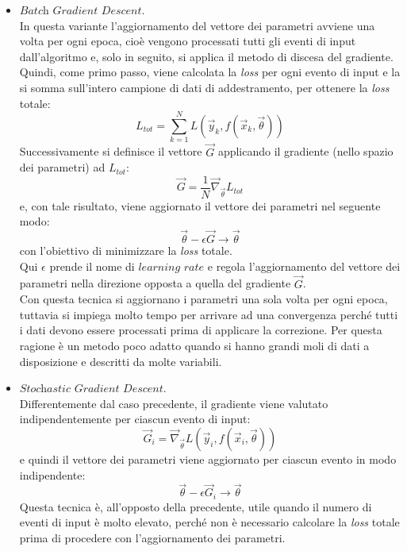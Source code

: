 \begin{itemize}
	\item $\textit{Batch Gradient Descent}$. \\
	In questa variante l'aggiornamento del vettore dei parametri avviene una volta per ogni epoca, cioè vengono processati tutti gli eventi di input dall'algoritmo e, solo in seguito, si applica il metodo di discesa del gradiente. Quindi, come primo passo, viene calcolata la \textit{loss} per ogni evento di input e la si somma sull'intero campione di dati di addestramento, per ottenere la \textit{loss} totale:
	\begin{equation}
		L_{tot} = \sum_{k=1}^{N} L(\vec{y}_k,f(\vec{x}_k,\vec{\theta}))
	\end{equation}
	Successivamente si definisce il vettore $\vec{G}$ applicando il gradiente (nello spazio dei parametri) ad $L_{tot}$:
	\begin{equation}
		\vec{G} = \frac{1}{N}  \vec{\nabla}_{\vec{\theta}} L_{tot}
	\end{equation}
	e, con tale risultato, viene aggiornato il vettore dei parametri nel seguente modo:
	\begin{equation}
	\vec{\theta} - \epsilon\vec{G} \rightarrow \vec{\theta}
	\end{equation}
	con l'obiettivo di minimizzare la \textit{loss} totale.\\
	Qui $\epsilon$ prende il nome di $\textit{learning rate}$ e regola l'aggiornamento del vettore dei parametri nella direzione opposta a quella del gradiente $\vec{G}$.\\
	Con questa tecnica si aggiornano i parametri una sola volta per ogni epoca, tuttavia si impiega molto tempo per arrivare ad una convergenza perché tutti i dati devono essere processati prima di applicare la correzione. Per questa ragione è un metodo poco adatto quando si hanno grandi moli di dati a disposizione e descritti da molte variabili. \\
	 
	\item $\textit{Stochastic Gradient Descent}$. \\
	Differentemente dal caso precedente, il gradiente viene valutato indipendentemente per ciascun evento di input:
	\begin{equation}
	\vec{G}_i =  \vec{\nabla}_{\vec{\theta}} L(\vec{y}_i,f(\vec{x}_i,\vec{\theta})) 
	\end{equation}	
	 e quindi  il vettore dei parametri viene aggiornato per ciascun evento in modo indipendente:
	\begin{equation}
	 \vec{\theta} - \epsilon\vec{G}_i \rightarrow \vec{\theta}
	 \end{equation}
	Questa tecnica è, all'opposto della precedente, utile quando il numero di eventi di input è molto elevato, perché non è necessario calcolare la \textit{loss} totale prima di procedere con l'aggiornamento dei parametri. \\
		

\end{itemize}

